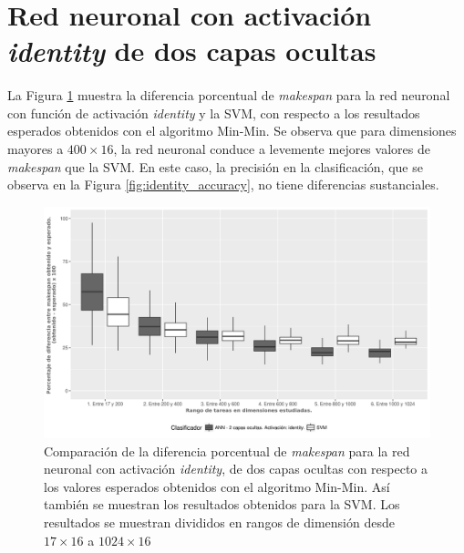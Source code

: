 \newpage %
 
\section{Red neuronal con activación \textit{identity} de dos capas ocultas}

\paragraph{} La Figura \ref{fig:identity_makespan} muestra la diferencia porcentual de \textit{makespan} para la red neuronal con función de activación \textit{identity} y la SVM, con respecto a los resultados esperados obtenidos con el algoritmo Min-Min.
Se observa que para dimensiones mayores a $ 400 \times 16$, la red neuronal conduce a levemente mejores valores de \textit{makespan} que la SVM.
En este caso, la precisión en la clasificación, que se observa en la Figura \ref{fig:identity_accuracy}, no tiene diferencias sustanciales. 

\begin{figure}[H]
  \centering
  \includegraphics[width=\columnwidth]{imagenes/identity/2_medianas_diferenciasann_2_capas_ocultas_identity.png}
  \caption{Comparación de la diferencia porcentual de \textit{makespan} para la red neuronal con activación \textit{identity}, de dos capas ocultas con respecto a los valores esperados obtenidos con el algoritmo Min-Min.
Así también se muestran los resultados obtenidos para la SVM.
Los resultados se muestran divididos en rangos de dimensión desde $ 17 \times 16$ a $ 1024 \times 16$}
  \label{fig:identity_makespan}
\end{figure}

\newpage %

